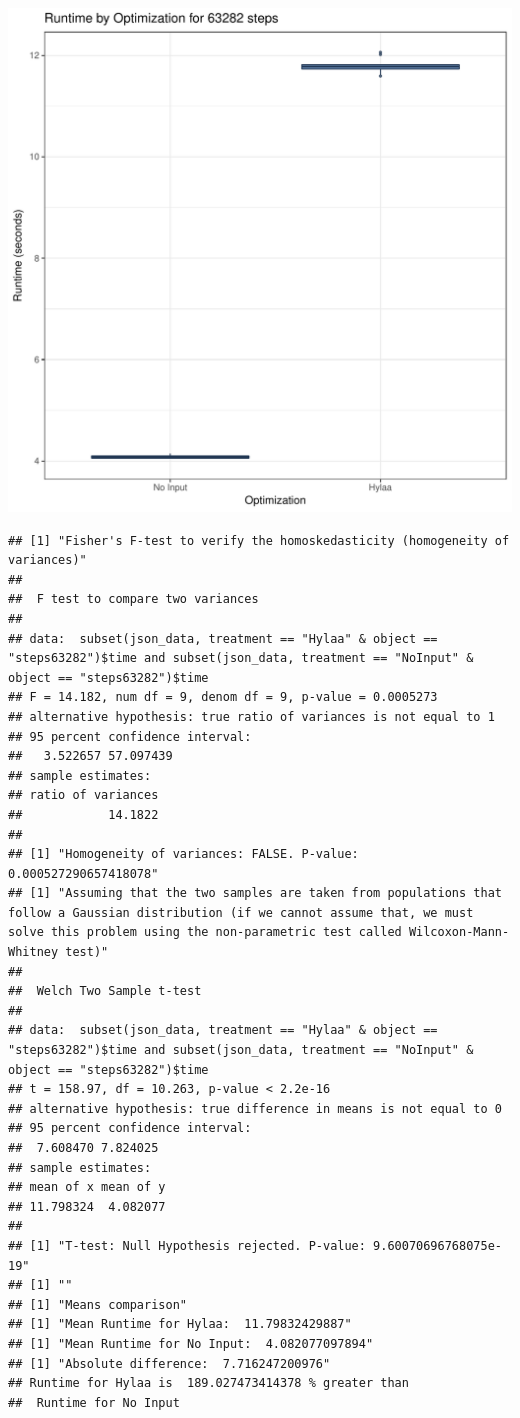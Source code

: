 \documentclass{article}\usepackage[]{graphicx}\usepackage[]{color}
\makeatletter
\def\maxwidth{ %
  \ifdim\Gin@nat@width>\linewidth
    \linewidth
  \else
    \Gin@nat@width
  \fi
}
\newenvironment{kframe}{%
 \def\at@end@of@kframe{}%
 \ifinner\ifhmode%
  \def\at@end@of@kframe{\end{minipage}}%
  \begin{minipage}{\columnwidth}%
 \fi\fi%
 \def\FrameCommand##1{\hskip\@totalleftmargin \hskip-\fboxsep
 \colorbox{shadecolor}{##1}\hskip-\fboxsep
     \hskip-\linewidth \hskip-\@totalleftmargin \hskip\columnwidth}%
 \MakeFramed {\advance\hsize-\width
   \@totalleftmargin\z@ \linewidth\hsize
   \@setminipage}}%
 {\par\unskip\endMakeFramed%
 \at@end@of@kframe}
\newenvironment{knitrout}{}{} %
\makeatother
\begin{document}
\begin{knitrout}
\color{fgcolor}
\includegraphics[width=\maxwidth]{figure/RH4_steps63282-1} 
\begin{kframe}\begin{verbatim}
## [1] "Fisher's F-test to verify the homoskedasticity (homogeneity of variances)"
## 
## 	F test to compare two variances
## 
## data:  subset(json_data, treatment == "Hylaa" & object == "steps63282")$time and subset(json_data, treatment == "NoInput" & object == "steps63282")$time
## F = 14.182, num df = 9, denom df = 9, p-value = 0.0005273
## alternative hypothesis: true ratio of variances is not equal to 1
## 95 percent confidence interval:
##   3.522657 57.097439
## sample estimates:
## ratio of variances 
##            14.1822 
## 
## [1] "Homogeneity of variances: FALSE. P-value: 0.000527290657418078"
## [1] "Assuming that the two samples are taken from populations that follow a Gaussian distribution (if we cannot assume that, we must solve this problem using the non-parametric test called Wilcoxon-Mann-Whitney test)"
## 
## 	Welch Two Sample t-test
## 
## data:  subset(json_data, treatment == "Hylaa" & object == "steps63282")$time and subset(json_data, treatment == "NoInput" & object == "steps63282")$time
## t = 158.97, df = 10.263, p-value < 2.2e-16
## alternative hypothesis: true difference in means is not equal to 0
## 95 percent confidence interval:
##  7.608470 7.824025
## sample estimates:
## mean of x mean of y 
## 11.798324  4.082077 
## 
## [1] "T-test: Null Hypothesis rejected. P-value: 9.60070696768075e-19"
## [1] ""
## [1] "Means comparison"
## [1] "Mean Runtime for Hylaa:  11.79832429887"
## [1] "Mean Runtime for No Input:  4.082077097894"
## [1] "Absolute difference:  7.716247200976"
## Runtime for Hylaa is  189.027473414378 % greater than 
##  Runtime for No Input
\end{verbatim}
\end{kframe}
\end{knitrout}
\end{document}
